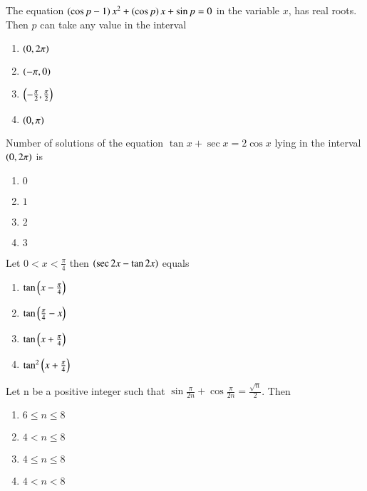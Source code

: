     \item The equation $\left(\cos{p}-1\right)x^2+\left(\cos{p}\right)x+\sin{p}=0$ in the variable $x$, has real roots. Then $p$ can take any value in the interval
        
        \hfill{}
        \begin{enumerate}
                \item $\left(0,2\pi\right)$
                \item $\left(-\pi,0\right)$
                \item $\left(-\frac{\pi}{2},\frac{\pi}{2}\right)$  
                \item $\left(0,\pi\right)$
        \end{enumerate}

    \item Number of solutions of the equation $\tan{x}+\sec{x} = 2\cos{x}$ lying in the interval $\left(0, 2\pi\right)$ is
        
        \hfill{}
        \begin{enumerate}
                \item $0$
                \item $1$
                \item $2$
                \item $3$
        \end{enumerate}

    \item Let $0<x<\frac{\pi}{4}$ then $\left(\sec{2x} - \tan{2x}\right)$ equals
        
        \hfill{}
        \begin{enumerate}
                \item $\tan{\ensuremath{\left(x-\frac{\pi}{4}\right)}}$
                \item $\tan{\ensuremath{\left(\frac{\pi}{4}-x\right)}}$
                \item $\tan{\ensuremath{\left(x+\frac{\pi}{4}\right)}}$ 
                \item $\tan^{2}{\left(x+\frac{\pi}{4}\right)}$
        \end{enumerate}

    \item Let n be a positive integer such that $\sin{\frac{\pi}{2n}} + \cos{\frac{\pi}{2n}} = \frac{\sqrt{n}}{2}$. Then
        
        \hfill{}
        \begin{enumerate}
                \item $6\le n\le8$
                \item $4<n\le8$
                \item $4\le n\le8$  
                \item $4<n<8$
        \end{enumerate}

